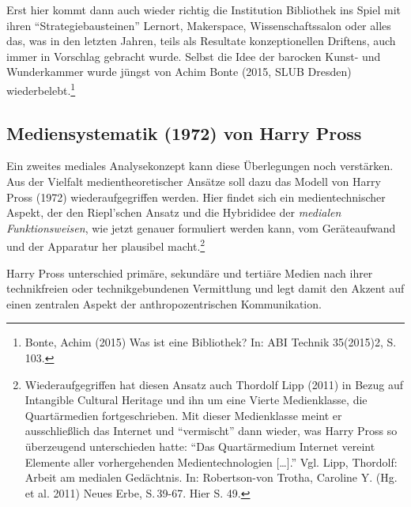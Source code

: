 \documentclass[a4paper,
fontsize=11pt,
oneside,
numbers=noperiodatend,
parskip=half-,
bibliography=totoc,
final
]{scrartcl}
\begin{document}
Erst hier kommt dann auch wieder richtig die Institution Bibliothek ins
Spiel mit ihren \enquote{Strategiebausteinen} Lernort, Makerspace,
Wissenschaftssalon oder alles das, was in den letzten Jahren, teils als
Resultate konzeptionellen Driftens, auch immer in Vorschlag gebracht
wurde. Selbst die Idee der barocken Kunst- und Wunderkammer wurde jüngst
von Achim Bonte (2015, SLUB Dresden) wiederbelebt.\footnote{Bonte, Achim
  (2015) Was ist eine Bibliothek? In: ABI Technik 35(2015)2, S.\,103.}

\subsection*{Mediensystematik (1972) von Harry
Pross}\label{mediensystematik-1972-von-harry-pross}

Ein zweites mediales Analysekonzept kann diese Überlegungen noch
verstärken. Aus der Vielfalt medientheoretischer Ansätze soll dazu das
Modell von Harry Pross (1972) wiederaufgegriffen werden. Hier findet
sich ein medientechnischer Aspekt, der den Riepl'schen Ansatz und die
Hybrididee der \emph{medialen Funktionsweisen}, wie jetzt genauer
formuliert werden kann, vom Geräteaufwand und der Apparatur her
plausibel macht.\footnote{Wiederaufgegriffen hat diesen Ansatz auch
  Thordolf Lipp (2011) in Bezug auf Intangible Cultural Heritage und ihn
  um eine Vierte Medienklasse, die Quartärmedien fortgeschrieben. Mit
  dieser Medienklasse meint er ausschließlich das Internet und
  \enquote{vermischt} dann wieder, was Harry Pross so überzeugend
  unterschieden hatte: \enquote{Das Quartärmedium Internet vereint
  Elemente aller vorhergehenden Medientechnologien {[}\ldots{}{]}.} Vgl.
  Lipp, Thordolf: Arbeit am medialen Gedächtnis. In: Robertson-von
  Trotha, Caroline Y. (Hg. et al. 2011) Neues Erbe, S.\,39-67. Hier S.
  49.}

Harry Pross unterschied primäre, sekundäre und tertiäre Medien nach
ihrer technikfreien oder technikgebundenen Vermittlung und legt damit
den Akzent auf einen zentralen Aspekt der anthropozentrischen
Kommunikation.
\end{document}
